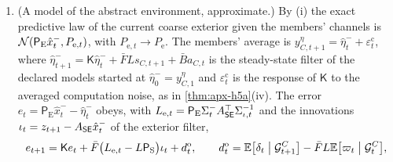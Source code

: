 \begin{theorem}
\begin{enumerate}
\begin{equation}
\end{equation}
with $P_t$ the deterministic covariance of $X_{\sE,t}$ given $(\mathfrak z_{0:t},\eta_{C,0:t})$. Here and in \eqref{eq:apx-blanket-rate}, $h(\bar R^{-1}R_{\mathsf T})$ is taken in the dimension $q$ of $s_C$, that is, $h(M)=\frac12(\tr M-q-\ln\det M)$ for a $q\times q$ matrix $M$; with the $k$ of \cref{def:apx-setting} in its place the identity would be off by $T(q-k)/2$. Consequently
\begin{equation}\label{eq:apx-blanket-rate}
\begin{gathered}
\limsup_{T\to\infty}\frac1T\KL\bigl(\mathbb P_{0:T}\Vert\hat{\mathbb P}_{0:T}\bigr)\le h\bigl(\bar Q^{-1}Q^y\bigr)+\tfrac12\tr\bigl(\bar Q^{-1}\Sigma_\delta\bigr),\\
\limsup_{T\to\infty}\frac1T\KL\bigl(\mathbb P_{0:T}\Vert\hat{\mathbb P}^{\mathrm s}_{0:T}\bigr)\le h\bigl(\bar Q^{-1}Q^y\bigr)+\tfrac12\tr\bigl(\bar Q^{-1}\Sigma_\delta\bigr)+h\bigl(\bar R^{-1}R_{\mathsf T}\bigr)+\tfrac12\tr\bigl(\bar R^{-1}\Sigma_\varpi\bigr) .
\end{gathered}
\end{equation}
Under (H-suff), $\KL(\mathbb P_{0:T}\Vert\hat{\mathbb P}_{0:T})$ is the relative entropy $\KL(P^{\pi'}\Vert\hat P^{\pi'})$ of \cref{thm:apx-h5a}(iii), $\check P_t$ and $P_t$ are both the covariance $P_t$ of \cref{lem:apx-separation}(a), and \eqref{eq:apx-blanket-path} is the identity of that part.
\item[(iv)] (A model of the abstract environment, approximate.) By (i) the exact predictive law of the current coarse exterior given the members' channels is $\mathcal{N}(\mathsf P_{\mathrm E}\hat x^-_t,P_{\mathrm e,t})$, with $P_{\mathrm e,t}\to P_{\mathrm e}$. The members' average is $y^\eta_{C,t+1}=\hat\eta^-_t+\varepsilon^{\mathrm c}_t$, where $\hat\eta^-_{t+1}=\mathsf K\hat\eta^-_t+\bar FLs_{C,t+1}+\bar Ba_{C,t}$ is the steady-state filter of the declared models started at $\hat\eta^-_0=y^\eta_{C,1}$ and $\varepsilon^{\mathrm c}_t$ is the response of $\mathsf K$ to the averaged computation noise, as in \cref{thm:apx-h5a}(iv). The error $e_t=\mathsf P_{\mathrm E}\hat x^-_t-\hat\eta^-_t$ obeys, with $L_{\mathrm e,t}=\mathsf P_{\mathrm E}\Sigma^-_tA_{\mathsf{S}\mathsf{E}}^\top\Sigma_{\iota,t}^{-1}$ and the innovations $\iota_t=z_{t+1}-A_{\mathsf{S}\mathsf{E}}\hat x^-_t$ of the exterior filter,
\begin{equation}\label{eq:apx-blanket-recursion}
e_{t+1}=\mathsf Ke_t+\bar F\bigl(L_{\mathrm e,t}-L\mathsf P_{\mathrm S}\bigr)\iota_t+d^{\mathrm o}_t,\qquad d^{\mathrm o}_t=\E\bigl[\delta_t\bigm|\mathcal G^C_{t+1}\bigr]-\bar FL\E\bigl[\varpi_t\bigm|\mathcal G^C_t\bigr],

\end{equation}
\end{enumerate}
\end{theorem}

